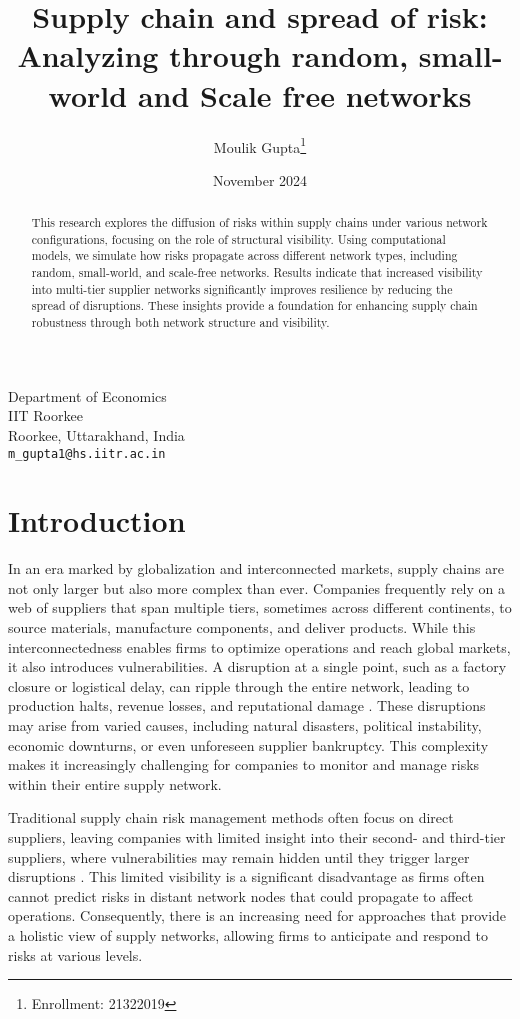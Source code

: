 \documentclass{article}
\title{Supply chain and spread of risk: Analyzing through random, small-world and Scale free networks}
\author{
    Moulik Gupta\thanks{Enrollment: 21322019}
}
\date{November 2024}
\begin{document}
\maketitle

\begin{center}
    Department of Economics \\ 
    IIT Roorkee \\ 
    Roorkee, Uttarakhand, India \\ 
    \texttt{m\_gupta1@hs.iitr.ac.in}
\end{center}

\begin{abstract}
    This research explores the diffusion of risks within supply chains under various network configurations, focusing on the role of structural visibility. Using computational models, we simulate how risks propagate across different network types, including random, small-world, and scale-free networks. Results indicate that increased visibility into multi-tier supplier networks significantly improves resilience by reducing the spread of disruptions. These insights provide a foundation for enhancing supply chain robustness through both network structure and visibility.
\end{abstract}

\section{Introduction}
In an era marked by globalization and interconnected markets, supply chains are not only larger but also more complex than ever. Companies frequently rely on a web of suppliers that span multiple tiers, sometimes across different continents, to source materials, manufacture components, and deliver products. While this interconnectedness enables firms to optimize operations and reach global markets, it also introduces vulnerabilities. A disruption at a single point, such as a factory closure or logistical delay, can ripple through the entire network, leading to production halts, revenue losses, and reputational damage \cite{Tang2006, Sheffi2005}. These disruptions may arise from varied causes, including natural disasters, political instability, economic downturns, or even unforeseen supplier bankruptcy. This complexity makes it increasingly challenging for companies to monitor and manage risks within their entire supply network.

Traditional supply chain risk management methods often focus on direct suppliers, leaving companies with limited insight into their second- and third-tier suppliers, where vulnerabilities may remain hidden until they trigger larger disruptions \cite{Choi2001, Nair2011}. This limited visibility is a significant disadvantage as firms often cannot predict risks in distant network nodes that could propagate to affect operations. Consequently, there is an increasing need for approaches that provide a holistic view of supply networks, allowing firms to anticipate and respond to risks at various levels.
\end{document}
